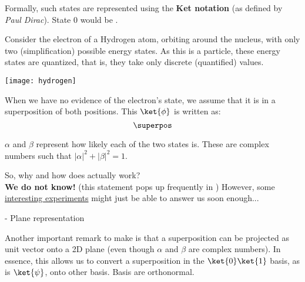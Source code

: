 \documentclass[aspectratio=43]{beamer}
\begin{document}
\begin{frame}{\qsp}
    \begin{cardTiny}
        Formally, such states are represented using the \textbf{Ket notation} (as defined by \textit{Paul Dirac}). State 0 would be . 
    \end{cardTiny}
    \begin{cardTiny}
        \begin{multicols}{2}
    		Consider the electron of a Hydrogen atom, orbiting around the nucleus, with only two (simplification) possible energy states. As this is a \q particle, these energy states are quantized, that is, they take only discrete (quantified) values. 
    		\begin{center}
    		\texttt{[image: hydrogen]}
    		\end{center}
	    \end{multicols}
    \end{cardTiny}
\pagenumber
\end{frame}

\begin{frame}{\qsp}
    \begin{card}
        When we have no evidence of the electron's state, we assume that it is in a superposition of both positions. This \qsp $\ket{\phi}$ is written as:
	\begin{equation*}
	    \superpos
	\end{equation*}
    \end{card}
    \begin{cardTiny}
        $\alpha$ and $\beta$ represent how likely each of the two states is. These are complex numbers such that $|\alpha|^2 + |\beta|^2 = 1$. 
    \end{cardTiny}
    \begin{cardTiny}
        \small{
        So, why and how does \qsp actually work?\\ \textbf{We do not know!} (this statement pops up frequently in \q) However, some \href{https://arxiv.org/abs/1707.09483}{interesting experiments} might just be able to answer us soon enough...
        }
    \end{cardTiny}
\pagenumber
\end{frame}

\begin{frame}{\qsp\space-  Plane representation}
    \begin{cardTiny}
        \begin{multicols}{2}
    		Another important remark to make is that a superposition can be projected as unit vector onto a 2D plane (even though $\alpha$ and $\beta$ are complex numbers). In essence, this allows us to convert a superposition in the $\ket{0}\ket{1}$ basis, as is $\ket{\psi}$, onto other basis. Basis are orthonormal.
    		\begin{center}
                
    		\end{center}
	    \end{multicols}
    \end{cardTiny}
\pagenumber
\end{frame}
\end{document}

